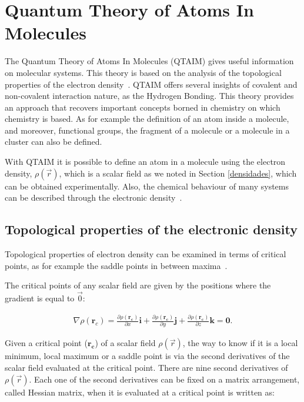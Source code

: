 \section{Quantum Theory of Atoms In Molecules}

The Quantum Theory of Atoms In Molecules (\gls{QTAIM}) gives useful information
on molecular systems. This theory is based on the analysis of the topological
properties of the electron density~\cite{bader}. QTAIM offers several insights
of covalent and non-covalent interaction nature, as the Hydrogen Bonding. This
theory provides an approach that recovers important concepts borned in
chemistry on which chemistry is based. As for example the definition of an atom
inside a molecule, and moreover, functional groups, the fragment of a molecule
or a molecule in a cluster can also be defined.

With QTAIM it is possible to define an atom in a molecule using the electron
density, $\rho(\vec{r})$, which is a scalar field as we noted in Section
\ref{densidades}, which can be obtained experimentally. Also, the chemical
behaviour of many systems can be described through the electronic
density~\cite{bader,matta}.


\subsection{Topological properties of the electronic density}

Topological properties of electron density can be examined in terms of critical
points, as for example the saddle points in between
maxima~\cite{bader,coppens,matta}.

The critical points of any scalar field are given by the positions where the
gradient is equal to $\vec{0}$:

\begin{align}
  \nabla\rho(\mathbf{r}_{c})= \frac{\partial\rho(\mathbf{r_{c}})}{\partial x}\mathbf{i} +
  \frac{\partial\rho(\mathbf{r_{c}})}{\partial y}\mathbf{j} +
  \frac{\partial\rho(\mathbf{r_{c}})}{\partial z}\mathbf{k} = \mathbf{0} .
\end{align}

Given a critical point ($\mathbf{r_{c}}$) of a scalar field $\rho(\vec{r})$,
the way to know if it is a local minimum, local maximum or a saddle point is
via the second derivatives of the scalar field evaluated at the critical point.
There are nine second derivatives of $\rho(\vec{r})$. Each one of the second
derivatives can be fixed on a matrix arrangement, called Hessian matrix, when
it is evaluated at a critical point is written as:

